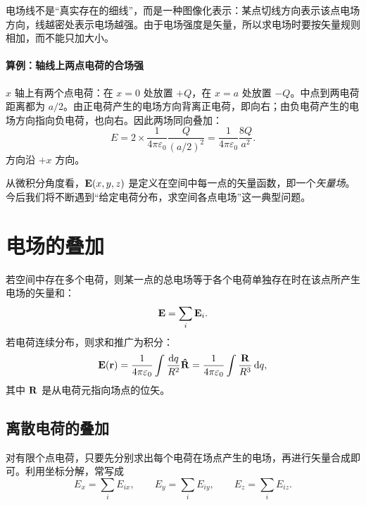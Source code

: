 \begin{remark}
电场线不是“真实存在的细线”，而是一种图像化表示：某点切线方向表示该点电场方向，线越密处表示电场越强。由于电场强度是矢量，所以求电场时要按矢量规则相加，而不能只加大小。
\end{remark}

\paragraph{算例：轴线上两点电荷的合场强} $x$ 轴上有两个点电荷：在 $x=0$ 处放置 $+Q$，在 $x=a$ 处放置 $-Q$。中点到两电荷距离都为 $a/2$。由正电荷产生的电场方向背离正电荷，即向右；由负电荷产生的电场方向指向负电荷，也向右。因此两场同向叠加：
\begin{equation}
E = 2\times \frac{1}{4\pi\varepsilon_0}\frac{Q}{(a/2)^2}
= \frac{1}{4\pi\varepsilon_0}\frac{8Q}{a^2}.
\end{equation}
方向沿 $+x$ 方向。

从微积分角度看，$\vb{E}(x,y,z)$ 是定义在空间中每一点的矢量函数，即一个\emph{矢量场}。今后我们将不断遇到“给定电荷分布，求空间各点电场”这一典型问题。

\section{电场的叠加}

\begin{theorem}[电场叠加原理]
若空间中存在多个电荷，则某一点的总电场等于各个电荷单独存在时在该点所产生电场的矢量和：
\begin{equation}
\vb{E} = \sum_i \vb{E}_i.
\end{equation}
若电荷连续分布，则求和推广为积分：
\begin{equation}
\vb{E}(\vb{r}) = \frac{1}{4\pi\varepsilon_0}\int \frac{\dd q}{R^2}\vu{R}
= \frac{1}{4\pi\varepsilon_0}\int \frac{\vb{R}}{R^3}\,\dd q,
\end{equation}
其中 $\vb{R}$ 是从电荷元指向场点的位矢。
\end{theorem}

\subsection*{离散电荷的叠加}

对有限个点电荷，只要先分别求出每个电荷在场点产生的电场，再进行矢量合成即可。利用坐标分解，常写成
\begin{equation}
E_x = \sum_i E_{ix}, \qquad E_y = \sum_i E_{iy}, \qquad E_z = \sum_i E_{iz}.
\end{equation}

